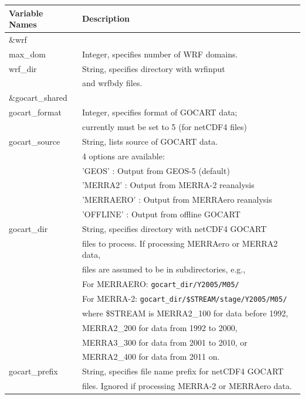 \begin{itemize}
\begin{tabular}{|l|l|} \hline
Variable Names & Description \\ \hline
\&wrf          & \\ \hline
max\_dom & Integer, specifies number of WRF domains. \\ \hline
wrf\_dir & String, specifies directory with wrfinput \\ 
         &  and wrfbdy files. \\ \hline
\&gocart\_shared & \\ \hline
gocart\_format & Integer, specifies format of GOCART data; \\ 
               & currently must be set to 5 (for netCDF4 files) \\ \hline
gocart\_source & String, lists source of GOCART data. \\
               & 4 options are available: \\
               & 'GEOS'     : Output from GEOS-5 (default) \\
               & 'MERRA2'   : Output from MERRA-2 reanalysis \\
               & 'MERRAERO' : Output from MERRAero reanalysis \\
               & 'OFFLINE'  : Output from offline GOCART \\ \hline
gocart\_dir & String, specifies directory with netCDF4 GOCART \\
            & files to process.  If processing MERRAero or MERRA2 data, \\
            & files are assumed to be in subdirectories, e.g., \\
            & For MERRAERO: \texttt{gocart\_dir/Y2005/M05/} \\
            & For MERRA-2:  \texttt{gocart\_dir/\$STREAM/stage/Y2005/M05/} \\
            &  where \$STREAM is MERRA2\_100 for data before 1992, \\
            &  MERRA2\_200 for data from 1992 to 2000, \\ 
            &  MERRA3\_300 for data from 2001 to 2010, or \\
            &  MERRA2\_400 for data from 2011 on. \\
gocart\_prefix & String, specifies file name prefix for netCDF4 GOCART \\
               & files. Ignored if processing MERRA-2 or MERRAero data.\\ \hline
\end{tabular} \\


\end{itemize}
